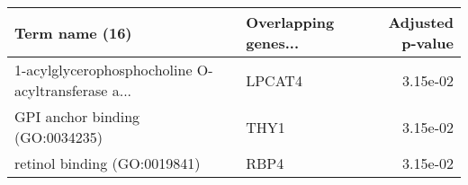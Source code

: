 \begin{tabular}{llr}
\toprule
                                    Term name (16) & Overlapping genes... &  Adjusted p-value \\
\midrule
1-acylglycerophosphocholine O-acyltransferase a... &               LPCAT4 &          3.15e-02 \\
                   GPI anchor binding (GO:0034235) &                 THY1 &          3.15e-02 \\
                      retinol binding (GO:0019841) &                 RBP4 &          3.15e-02 \\
\bottomrule
\end{tabular}
